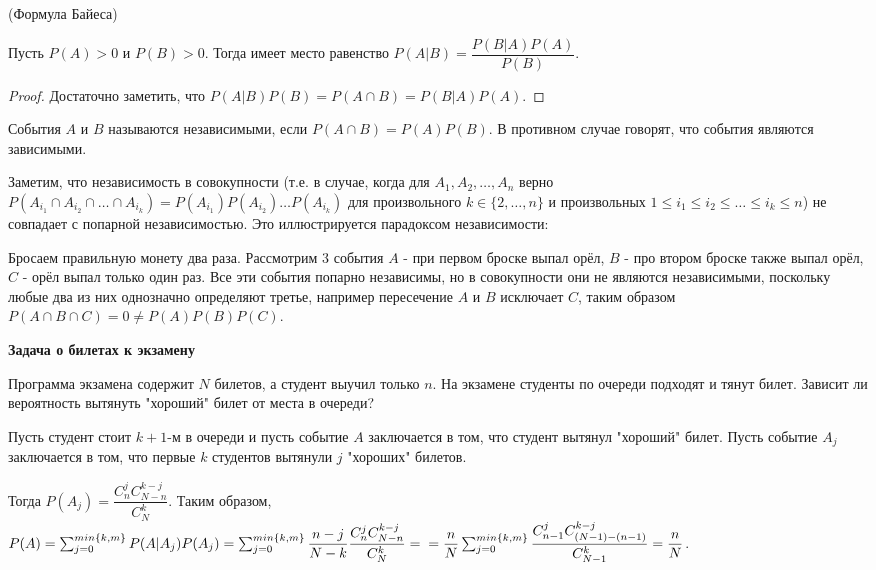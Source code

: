\documentclass[a4paper]{article}
\begin{document}
\begin{colloq}
	\begin{theorem*} (Формула Байеса)
		
		Пусть $P(A) > 0$ и $P(B) > 0$. Тогда имеет место равенство $P(A|B) = \dfrac{P(B|A)P(A)}{P(B)}$.
	\end{theorem*}

	\begin{proof}
		Достаточно заметить, что $P(A|B)P(B) = P(A \cap B) = P(B|A)P(A)$.
	\end{proof}

	\begin{definition*}
		События $A$ и $B$ называются независимыми, если $P(A \cap B) = P(A)P(B)$. В противном случае говорят, что события являются зависимыми.
	\end{definition*}

	Заметим, что независимость в совокупности (т.е. в случае, когда для $A_1, A_2, \dots, A_n$ верно $P(A_{i_1} \cap A_{i_2} \cap \dots \cap A_{i_k}) = P(A_{i_1})P(A_{i_2}) \dots P(A_{i_k})$ для произвольного $k \in \{2, \dots, n\}$ и произвольных $1 \leqslant i_1 \leqslant i_2 \leqslant \dots \leqslant i_k \leqslant n$) не совпадает с попарной независимостью. Это иллюстрируется парадоксом независимости:
	
	Бросаем правильную монету два раза. Рассмотрим 3 события $A$ - при первом броске выпал орёл, $B$ - про втором броске также выпал орёл, $C$ - орёл выпал только один раз. Все эти события попарно независимы, но в совокупности они не являются независимыми, поскольку любые два из них однозначно определяют третье, например пересечение $A$ и $B$ исключает $C$, таким образом $P(A \cap B \cap C) = 0 \neq P(A)P(B)P(C)$.
	
	\textbf{Задача о билетах к экзамену}
	
	Программа экзамена содержит $N$ билетов, а студент выучил только $n$. На экзамене
	студенты по очереди подходят и тянут билет. Зависит ли вероятность вытянуть "хороший"
	билет от места в очереди?
	
	Пусть студент стоит $k+1$-м в очереди и пусть событие $A$ заключается в том, что студент
	вытянул "хороший" билет. Пусть событие $A_j$ заключается в том, что первые $k$ студентов
	вытянули $j$ "хороших" билетов. 
	
	Тогда $P(A_j) = \dfrac{C_n^j C^{k-j}_{N-n}}{C_N^k}$. Таким образом,	$P(A) = \sum_{j=0}^{min\{k, m\}} P(A|A_j)P(A_j) = \sum_{j=0}^{min\{k, m\}} \dfrac{n-j}{N-k} \dfrac{C_n^j C^{k-j}_{N-n}}{C_N^k} = \\ = \dfrac{n}{N} \sum_{j=0}^{min\{k, m\}} \dfrac{C_{n-1}^j C^{k-j}_{(N - 1) - (n - 1)}}{C_{N - 1}^k} = \dfrac{n}{N}$.
   	

\end{colloq}
\end{document}
